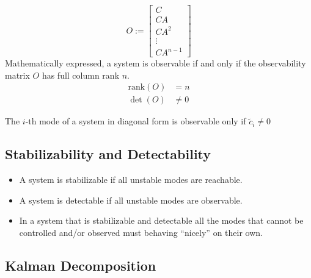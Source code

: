 \begin{equation*}
    O:= \begin{bmatrix}
        C      \\
        CA     \\
        CA^2   \\
        \vdots \\
        CA^{n-1}
    \end{bmatrix}
\end{equation*}
Mathematically expressed, a system is observable if and only if the observability matrix $O$ has full column rank $n$.
\begin{align*}
    \text{rank}(O) & = n    \\
    \det(O)        & \neq 0
\end{align*}


The $i$-th mode of a system in diagonal form is observable only if $\tilde{c}_i \neq 0$

\subsection{Stabilizability and Detectability}
\begin{itemize}
    \item A system is stabilizable if all unstable modes are reachable.
    \item A system is detectable if all unstable modes are observable.
    \item In a system that is stabilizable and detectable all the modes that cannot be controlled and/or observed must behaving ``nicely'' on their own.
\end{itemize}

\subsection{Kalman Decomposition}

